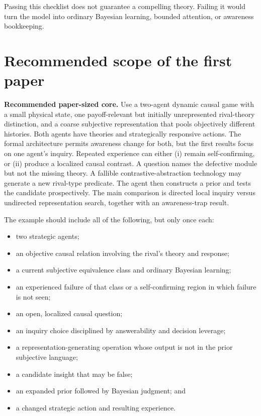 \documentclass[11pt]{article}
\begin{document}
	Passing this checklist does not guarantee a compelling theory.  Failing it would turn the model into ordinary Bayesian learning, bounded attention, or awareness bookkeeping.
	
	\section{Recommended scope of the first paper}
	
	\begin{designbox}
		\textbf{Recommended paper-sized core.}
		Use a two-agent dynamic causal game with a small physical state, one payoff-relevant but initially unrepresented rival-theory distinction, and a coarse subjective representation that pools objectively different histories.  Both agents have theories and strategically responsive actions.  The formal architecture permits awareness change for both, but the first results focus on one agent's inquiry.  Repeated experience can either (i) remain self-confirming, or (ii) produce a localized causal contrast.  A question names the defective module but not the missing theory.  A fallible contrastive-abstraction technology may generate a new rival-type predicate.  The agent then constructs a prior and tests the candidate prospectively.  The main comparison is directed local inquiry versus undirected representation search, together with an awareness-trap result.
	\end{designbox}
	
	The example should include all of the following, but only once each:
	\begin{itemize}
		\item two strategic agents;
		\item an objective causal relation involving the rival's theory and response;
		\item a current subjective equivalence class and ordinary Bayesian learning;
		\item an experienced failure of that class or a self-confirming region in which failure is not seen;
		\item an open, localized causal question;
		\item an inquiry choice disciplined by answerability and decision leverage;
		\item a representation-generating operation whose output is not in the prior subjective language;
		\item a candidate insight that may be false;
		\item an expanded prior followed by Bayesian judgment; and
		\item a changed strategic action and resulting experience.
	\end{itemize}
	
\end{document}
